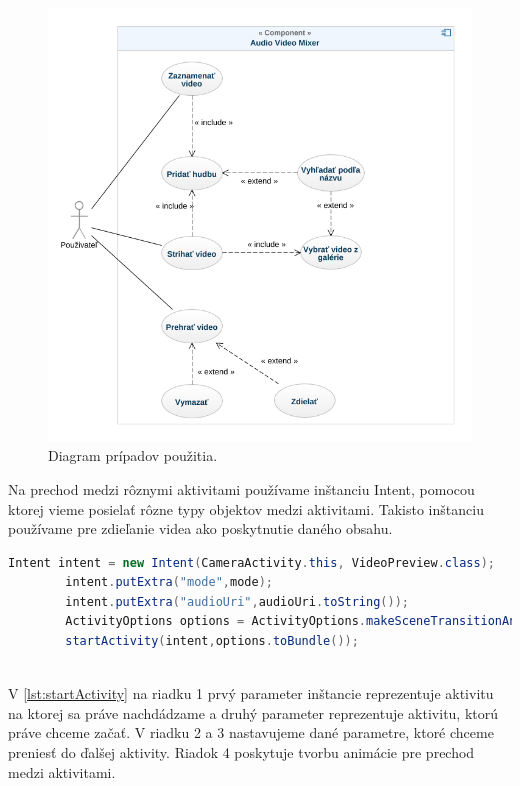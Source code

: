 \documentclass[12pt, oneside]{book}
\begin{document}
\begin{figure}[H]
    \centering
    \includegraphics[width=1\textwidth]{images/usecase-diagram.png}
    \caption{Diagram prípadov použitia. }
    \label{fig:obr06}
\end{figure}

Na prechod medzi rôznymi aktivitami používame inštanciu Intent, pomocou ktorej vieme posielať rôzne typy objektov medzi aktivitami. Takisto inštanciu používame pre zdieľanie videa ako poskytnutie daného obsahu.


\begin{lstlisting}[language=Java, label={lst:startActivity}, caption=Náhľad na príklad pre začiatok novej aktivity obsahujúce dané parametre.]
Intent intent = new Intent(CameraActivity.this, VideoPreview.class);
        intent.putExtra("mode",mode);
        intent.putExtra("audioUri",audioUri.toString());
        ActivityOptions options = ActivityOptions.makeSceneTransitionAnimation(this);
        startActivity(intent,options.toBundle());
        
\end{lstlisting}

V \autoref{lst:startActivity} na riadku 1 prvý parameter inštancie reprezentuje aktivitu na ktorej sa práve nachdádzame a druhý parameter reprezentuje aktivitu, ktorú práve chceme začať.
V riadku 2 a 3 nastavujeme dané parametre, ktoré chceme preniesť do ďalšej aktivity.
Riadok 4 poskytuje tvorbu animácie pre prechod medzi aktivitami.
\end{document}
